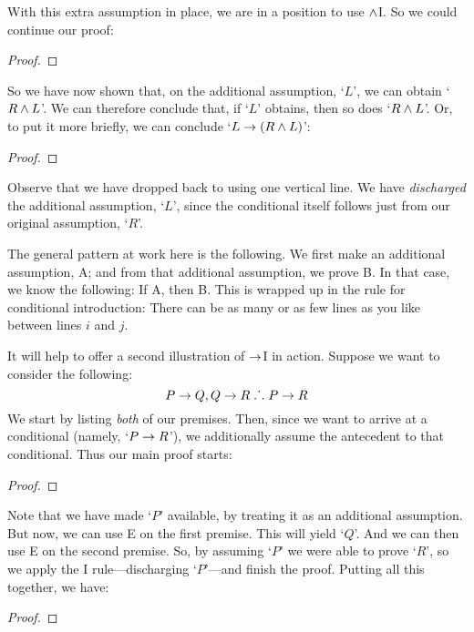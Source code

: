 With this extra assumption in place, we are in a position to use $\wedge$I. So we could continue our proof:
	\begin{proof}
		\open
	\end{proof}
So we have now shown that, on the additional assumption, `$L$', we can obtain `$R \wedge L$'. We can therefore conclude that, if `$L$' obtains, then so does `$R \wedge L$'. Or, to put it more briefly, we can conclude `$L \rightarrow (R \wedge L)$':
	\begin{proof}
		\open
			\close
	\end{proof}
Observe that we have dropped back to using one vertical line.  We have \emph{discharged} the additional assumption, `$L$', since the conditional itself follows just from our original assumption, `$R$'.

The general pattern at work here is the following. We first make an additional assumption, A; and from that additional assumption, we prove B. In that case, we know the following: If A, then B. This is wrapped up in the rule for conditional introduction:
There can be as many or as few lines as you like between lines $i$ and $j$. 

It will help to offer a second  illustration of $\rightarrow$I in action. Suppose we want to consider the following:
	$$P \rightarrow Q, Q \rightarrow R \mathrel{\ldotp\dot{}\,\ldotp} P \rightarrow R$$
We start by listing \emph{both} of our premises. Then, since we want to arrive at a conditional (namely, `$P \rightarrow R$'), we additionally assume the antecedent to that conditional. Thus our main proof starts:
\begin{proof}
	\open
	\close
\end{proof}
Note that we have made `$P$' available, by treating it as an additional assumption. But now, we can use {\eif}E on the first premise. This will yield `$Q$'. And we can then use {\eif}E on the second premise. So, by assuming `$P$' we were able to prove `$R$', so we apply the {\eif}I rule---discharging `$P$'---and finish the proof. Putting all this together, we have:
\label{HSproof}
\begin{proof}
	\open
	\close
\end{proof}



